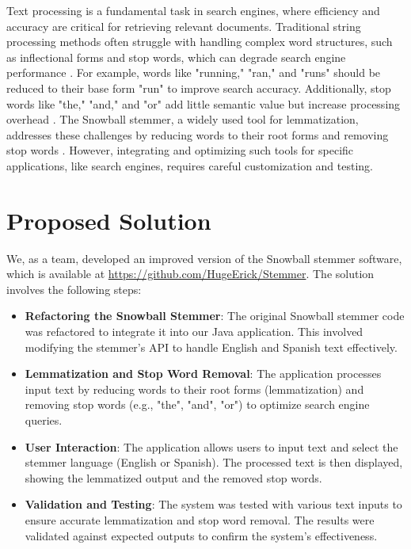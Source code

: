 \documentclass[twoside]{article}
\begin{document}
Text processing is a fundamental task in search engines, where efficiency and accuracy are critical for retrieving relevant documents. Traditional string processing methods often struggle with handling complex word structures, such as inflectional forms and stop words, which can degrade search engine performance \cite{geeksforgeeks1}. For example, words like "running," "ran," and "runs" should be reduced to their base form "run" to improve search accuracy. Additionally, stop words like "the," "and," and "or" add little semantic value but increase processing overhead \cite{geeksforgeeks3}. The Snowball stemmer, a widely used tool for lemmatization, addresses these challenges by reducing words to their root forms and removing stop words \cite{snowball}. However, integrating and optimizing such tools for specific applications, like search engines, requires careful customization and testing.

\section{Proposed Solution}
We, as a team, developed an improved version of the Snowball stemmer software, which is available at \url{https://github.com/HugeErick/Stemmer}. The solution involves the following steps:

\begin{itemize}
    \item \textbf{Refactoring the Snowball Stemmer}: The original Snowball stemmer code was refactored to integrate it into our Java application. This involved modifying the stemmer's API to handle English and Spanish text effectively.
    \item \textbf{Lemmatization and Stop Word Removal}: The application processes input text by reducing words to their root forms (lemmatization) and removing stop words (e.g., "the", "and", "or") to optimize search engine queries.
    \item \textbf{User Interaction}: The application allows users to input text and select the stemmer language (English or Spanish). The processed text is then displayed, showing the lemmatized output and the removed stop words.
    \item \textbf{Validation and Testing}: The system was tested with various text inputs to ensure accurate lemmatization and stop word removal. The results were validated against expected outputs to confirm the system's effectiveness.
\end{itemize}
\end{document}
